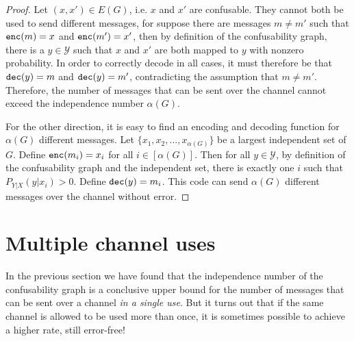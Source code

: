 \begin{proof}
Let $(x,x') \in E(G)$, i.e. $x$ and $x'$ are confusable. They cannot both be used to send different messages, for suppose there are messages $m \neq m'$ such that $\mathtt{enc}(m) = x$ and $\mathtt{enc}(m') = x'$, then by definition of the confusability graph, there is a $y \in \mathcal{Y}$ such that $x$ and $x'$ are both mapped to $y$ with nonzero probability. In order to correctly decode in all cases, it must therefore be that $\mathtt{dec}(y) = m$ and $\mathtt{dec}(y) = m'$, contradicting the assumption that $m \neq m'$. Therefore, the number of messages that can be sent over the channel cannot exceed the independence number $\alpha(G)$.

For the other direction, it is easy to find an encoding and decoding function for $\alpha(G)$ different messages. Let $\{x_1, x_2, ..., x_{\alpha(G)}\}$ be a largest independent set of $G$. Define $\mathtt{enc}(m_i) = x_i$ for all $i \in [\alpha(G)]$. Then for all $y \in \mathcal{Y}$, by definition of the confusability graph and the independent set, there is exactly one $i$ such that $P_{Y|X}(y|x_i) > 0$. Define $\mathtt{dec}(y) = m_i$. This code can send $\alpha(G)$ different messages over the channel without error.
\end{proof}


\section{Multiple channel uses}
In the previous section we have found that the independence number of the confusability graph is a conclusive upper bound for the number of messages that can be sent over a channel \emph{in a single use}. But it turns out that if the same channel is allowed to be used more than once, it is sometimes possible to achieve a higher rate, still error-free!

